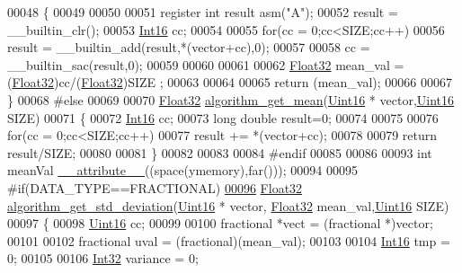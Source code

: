 \begin{DoxyCode}
00048 \{
00049     
00050     
00051     \textcolor{keyword}{register} \textcolor{keywordtype}{int} result \textcolor{keyword}{asm}(\textcolor{stringliteral}{"A"});
00052     result = \_\_builtin\_clr();
00053     \hyperlink{a00072_a659ce9e5eb6571f9984ffc7caad2660a}{Int16} cc;
00054 
00055     \textcolor{keywordflow}{for}(cc = 0;cc<SIZE;cc++)
00056         result = \_\_builtin\_add(result,*(vector+cc),0);
00057  
00058     cc = \_\_builtin\_sac(result,0);
00059 
00060 
00061     
00062     \hyperlink{a00072_a87d38f886e617ced2698fc55afa07637}{Float32} mean\_val = (\hyperlink{a00072_a87d38f886e617ced2698fc55afa07637}{Float32})cc/(\hyperlink{a00072_a87d38f886e617ced2698fc55afa07637}{Float32})SIZE ;
00063     
00064 
00065     \textcolor{keywordflow}{return}  (mean\_val);
00066 
00067 \}
00068 \textcolor{preprocessor}{#else}
00069 
00070 \hyperlink{a00072_a87d38f886e617ced2698fc55afa07637}{Float32} \hyperlink{a00038_ac02222eba93356b04a6327ffcf82b5cf}{algorithm\_get\_mean}(\hyperlink{a00072_a59a9f6be4562c327cbfb4f7e8e18f08b}{Uint16} * vector,\hyperlink{a00072_a59a9f6be4562c327cbfb4f7e8e18f08b}{Uint16} SIZE)
00071 \{
00072     \hyperlink{a00072_a659ce9e5eb6571f9984ffc7caad2660a}{Int16} cc;
00073     \textcolor{keywordtype}{long} \textcolor{keywordtype}{double} result=0;
00074 
00075 
00076     \textcolor{keywordflow}{for}(cc = 0;cc<SIZE;cc++)
00077         result += *(vector+cc);
00078 
00079     \textcolor{keywordflow}{return}  result/SIZE;
00080 
00081 \}
00082 
00083 
00084 \textcolor{preprocessor}{#endif}
00085 
00086 
00093 \textcolor{keywordtype}{int} meanVal \hyperlink{a00038_afc24892209555236c0000b91cfc8ab15}{\_\_attribute\_\_}((space(ymemory),far()));
00094 
00095 \textcolor{preprocessor}{#if(DATA\_TYPE==FRACTIONAL)}
\hypertarget{a00038_source_l00096}{}\hyperlink{a00038_a97eb6437dda088f144d791e49cd3dc2a}{00096} \hyperlink{a00072_a87d38f886e617ced2698fc55afa07637}{Float32}     \hyperlink{a00038_a97eb6437dda088f144d791e49cd3dc2a}{algorithm\_get\_std\_deviation}(\hyperlink{a00072_a59a9f6be4562c327cbfb4f7e8e18f08b}{Uint16} * vector,
      \hyperlink{a00072_a87d38f886e617ced2698fc55afa07637}{Float32} mean\_val,\hyperlink{a00072_a59a9f6be4562c327cbfb4f7e8e18f08b}{Uint16} SIZE)
00097 \{
00098     \hyperlink{a00072_a59a9f6be4562c327cbfb4f7e8e18f08b}{Uint16} cc;
00099 
00100     fractional *vect                = (fractional *)vector;
00101 
00102     fractional  uval                = (fractional)(mean\_val);
00103 
00104     \hyperlink{a00072_a659ce9e5eb6571f9984ffc7caad2660a}{Int16}  tmp                      = 0;
00105 
00106     \hyperlink{a00072_a184d0ff2424cf4b81c68ce9538481a04}{Int32}  variance                 = 0;

\end{DoxyCode}
